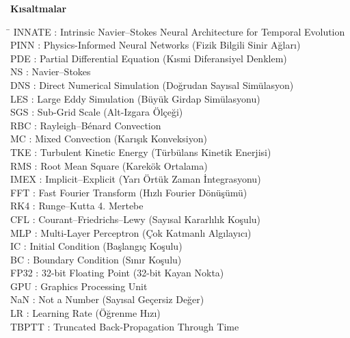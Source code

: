 \documentclass[12pt,a4paper]{report}
\begin{document}
\textbf{Kısaltmalar}
\begin{tabbing}
\hspace{3cm} \= \kill
INNATE \> : Intrinsic Navier--Stokes Neural Architecture for Temporal Evolution \\
PINN \> : Physics-Informed Neural Networks (Fizik Bilgili Sinir Ağları) \\
PDE \> : Partial Differential Equation (Kısmi Diferansiyel Denklem) \\
NS \> : Navier--Stokes \\
DNS \> : Direct Numerical Simulation (Doğrudan Sayısal Simülasyon) \\
LES \> : Large Eddy Simulation (Büyük Girdap Simülasyonu) \\
SGS \> : Sub-Grid Scale (Alt-Izgara Ölçeği) \\
RBC \> : Rayleigh--B\'enard Convection \\
MC \> : Mixed Convection (Karışık Konveksiyon) \\
TKE \> : Turbulent Kinetic Energy (Türbülans Kinetik Enerjisi) \\
RMS \> : Root Mean Square (Karekök Ortalama) \\
IMEX \> : Implicit--Explicit (Yarı Örtük Zaman İntegrasyonu) \\
FFT \> : Fast Fourier Transform (Hızlı Fourier Dönüşümü) \\
RK4 \> : Runge--Kutta 4. Mertebe \\
CFL \> : Courant--Friedrichs--Lewy (Sayısal Kararlılık Koşulu) \\
MLP \> : Multi-Layer Perceptron (Çok Katmanlı Algılayıcı) \\
IC \> : Initial Condition (Başlangıç Koşulu) \\
BC \> : Boundary Condition (Sınır Koşulu) \\
FP32 \> : 32-bit Floating Point (32-bit Kayan Nokta) \\
GPU \> : Graphics Processing Unit \\
NaN \> : Not a Number (Sayısal Geçersiz Değer) \\
LR \> : Learning Rate (Öğrenme Hızı) \\
TBPTT \> : Truncated Back-Propagation Through Time \\
\end{tabbing}
\end{document}
